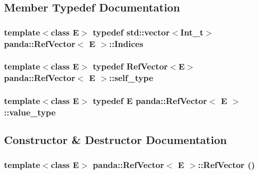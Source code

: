 \subsection{Member Typedef Documentation}
\hypertarget{classpanda_1_1RefVector_a062e47758de4bd1c58242267d4aabef8}{
\subsubsection[{Indices}]{\setlength{\rightskip}{0pt plus 5cm}template$<$class E$>$ typedef std::vector$<$Int\_\-t$>$ {\bf panda::RefVector}$<$ E $>$::{\bf Indices}}}
\label{classpanda_1_1RefVector_a062e47758de4bd1c58242267d4aabef8}
\hypertarget{classpanda_1_1RefVector_aa4b73d036e11c1acaa25d7dc6c5c3f5c}{
\subsubsection[{self\_\-type}]{\setlength{\rightskip}{0pt plus 5cm}template$<$class E$>$ typedef {\bf RefVector}$<$E$>$ {\bf panda::RefVector}$<$ E $>$::{\bf self\_\-type}}}
\label{classpanda_1_1RefVector_aa4b73d036e11c1acaa25d7dc6c5c3f5c}
\hypertarget{classpanda_1_1RefVector_ac553f3b6060e39d4418982e1a121d513}{
\subsubsection[{value\_\-type}]{\setlength{\rightskip}{0pt plus 5cm}template$<$class E$>$ typedef E {\bf panda::RefVector}$<$ E $>$::{\bf value\_\-type}}}
\label{classpanda_1_1RefVector_ac553f3b6060e39d4418982e1a121d513}


\subsection{Constructor \& Destructor Documentation}
\hypertarget{classpanda_1_1RefVector_abf4109e5a3416a34cf08b38254be453d}{
\subsubsection[{RefVector}]{\setlength{\rightskip}{0pt plus 5cm}template$<$class E$>$ {\bf panda::RefVector}$<$ E $>$::{\bf RefVector} ()}}
\label{classpanda_1_1RefVector_abf4109e5a3416a34cf08b38254be453d}


